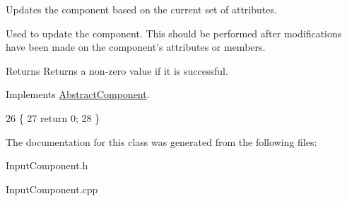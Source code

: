 Updates the component based on the current set of attributes. 

Used to update the component. This should be performed after modifications have been made on the component's attributes or members.

\begin{DoxyReturn}{Returns}
Returns a non-\/zero value if it is successful. 
\end{DoxyReturn}


Implements \hyperlink{class_abstract_component_a35c9cab4e3845a947609b6ada8dc89cf}{Abstract\-Component}.


\begin{DoxyCode}
26                            \{
27     \textcolor{keywordflow}{return} 0;
28 \}\end{DoxyCode}


The documentation for this class was generated from the following files\-:\begin{DoxyCompactItemize}
\item 
Input\-Component.\-h\item 
Input\-Component.\-cpp\end{DoxyCompactItemize}
